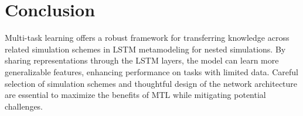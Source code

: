 \section{Conclusion} \label{sec3:conclusion}

Multi-task learning offers a robust framework for transferring knowledge across related simulation schemes in LSTM metamodeling for nested simulations. 
By sharing representations through the LSTM layers, the model can learn more generalizable features, enhancing performance on tasks with limited data. 
Careful selection of simulation schemes and thoughtful design of the network architecture are essential to maximize the benefits of MTL while mitigating potential challenges.

